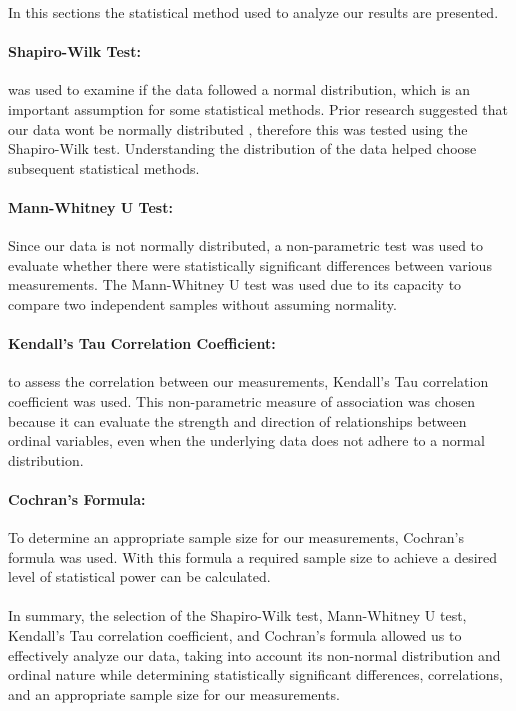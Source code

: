 In this sections the statistical method used to analyze our results are presented. 

\paragraph{Shapiro-Wilk Test:} was used to examine if the data followed a normal distribution, which is an important assumption for some statistical methods. Prior research suggested that our data wont be normally distributed \cite{biksbois}, therefore this was tested using the Shapiro-Wilk test. Understanding the distribution of the data helped choose subsequent statistical methods.

\paragraph{Mann-Whitney U Test:}
Since our data is not normally distributed, a non-parametric test was used to evaluate whether there were statistically significant differences between various measurements. The Mann-Whitney U test was used due to its capacity to compare two independent samples without assuming normality.

\paragraph{Kendall's Tau Correlation Coefficient:}
to assess the correlation between our measurements, Kendall's Tau correlation coefficient was used. This non-parametric measure of association was chosen because it can evaluate the strength and direction of relationships between ordinal variables, even when the underlying data does not adhere to a normal distribution. %

\paragraph{Cochran's Formula:}
To determine an appropriate sample size for our measurements, Cochran's formula was used. With this formula a required sample size to achieve a desired level of statistical power can be calculated.

\paragraph{}
In summary, the selection of the Shapiro-Wilk test, Mann-Whitney U test, Kendall's Tau correlation coefficient, and Cochran's formula allowed us to effectively analyze our data, taking into account its non-normal distribution and ordinal nature while determining statistically significant differences, correlations, and an appropriate sample size for our measurements.